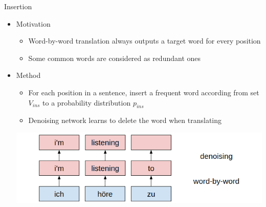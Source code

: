 \documentclass[11pt, a4paper, landscape]{article}
\begin{document}
\vfill

\NewPage
{}	
\vfill	
Insertion
\begin{itemize}
	\item Motivation
	\begin{itemize}
		\item Word-by-word translation always outputs a target word for every position
		\item Some common words are considered as redundant ones
	\end{itemize}
	\item Method
	\begin{itemize}
		\item For each position in a sentence, insert a frequent word according from set ${V_{ins}}$ to a probability distribution ${p_{ins}}$
		\item Denoising network learns to delete the word when translating
	\end{itemize}
	\begin{center}
		\vspace{0.5em}
		\hspace{-1cm}\includegraphics[width=0.8\linewidth]{insertion}
	\end{center}\vspace{0.5em}	
\end{itemize}

\vfill
\end{document}
